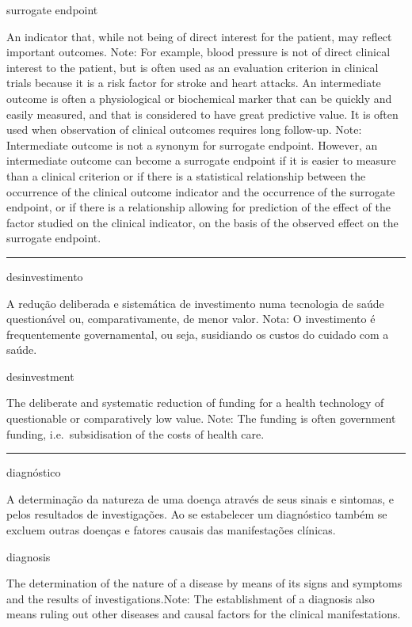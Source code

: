 \documentclass[
]{book}
\begin{document}
surrogate endpoint

An indicator that, while not being of direct interest for the patient, may reflect important outcomes. Note: For example, blood pressure is not of direct clinical interest to the patient, but is often used as an evaluation criterion in clinical trials because it is a risk factor for stroke and heart attacks. An intermediate outcome is often a physiological or biochemical marker that can be quickly and easily measured, and that is considered to have great predictive value. It is often used when observation of clinical outcomes requires long follow-up. Note: Intermediate outcome is not a synonym for surrogate endpoint. However, an intermediate outcome can become a surrogate endpoint if it is easier to measure than a clinical criterion or if there is a statistical relationship between the occurrence of the clinical outcome indicator and the occurrence of the surrogate endpoint, or if there is a relationship allowing for prediction of the effect of the factor studied on the clinical indicator, on the basis of the observed effect on the surrogate endpoint.

\begin{center}\rule{0.5\linewidth}{0.5pt}\end{center}

desinvestimento

A redução deliberada e sistemática de investimento numa tecnologia de saúde questionável ou, comparativamente, de menor valor. Nota: O investimento é frequentemente governamental, ou seja, susidiando os custos do cuidado com a saúde.

desinvestment

The deliberate and systematic reduction of funding for a health technology of questionable or comparatively low value. Note: The funding is often government funding, i.e.~subsidisation of the costs of health care.

\begin{center}\rule{0.5\linewidth}{0.5pt}\end{center}

diagnóstico

A determinação da natureza de uma doença através de seus sinais e sintomas, e pelos resultados de investigações. Ao se estabelecer um diagnóstico também se excluem outras doenças e fatores causais das manifestações clínicas.

diagnosis

The determination of the nature of a disease by means of its signs and symptoms and the results of investigations.Note: The establishment of a diagnosis also means ruling out other diseases and causal factors for the clinical manifestations.
\end{document}
